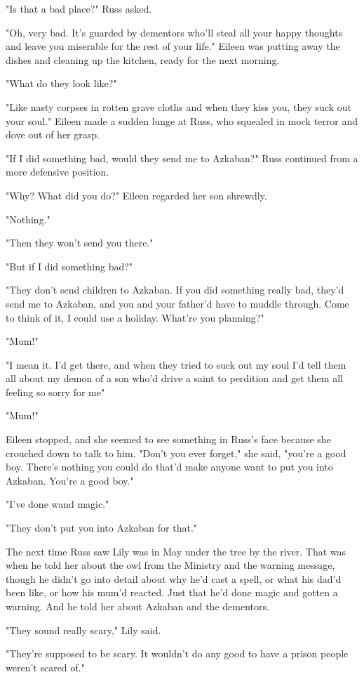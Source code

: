 "Is that a bad place?" Russ asked.

"Oh, very bad. It's guarded by dementors who'll steal all your happy thoughts and leave you miserable for the rest of your life." Eileen was putting away the dishes and cleaning up the kitchen, ready for the next morning.

"What do they look like?"

"Like nasty corpses in rotten grave cloths and when they kiss you, they suck out your soul." Eileen made a sudden lunge at Russ, who squealed in mock terror and dove out of her grasp.

"If I did something bad, would they send me to Azkaban?" Russ continued from a more defensive position.

"Why? What did you do?" Eileen regarded her son shrewdly.

"Nothing."

"Then they won't send you there."

"But if I did something bad?"

"They don't send children to Azkaban. If you did something really bad, they'd send me to Azkaban, and you and your father'd have to muddle through. Come to think of it, I could use a holiday. What're you planning?"

"Mum!"

"I mean it. I'd get there, and when they tried to suck out my soul I'd tell them all about my demon of a son who'd drive a saint to perdition and get them all feeling so sorry for me{\el}"

"Mum!"

Eileen stopped, and she seemed to see something in Russ's face because she crouched down to talk to him. "Don't you ever forget," she said, "you're a good boy. There's nothing you could do that'd make anyone want to put you into Azkaban. You're a good boy."

"I've done wand magic."

"They don't put you into Azkaban for that."

The next time Russ saw Lily was in May under the tree by the river. That was when he told her about the owl from the Ministry and the warning message, though he didn't go into detail about why he'd cast a spell, or what his dad'd been like, or how his mum'd reacted. Just that he'd done magic and gotten a warning. And he told her about Azkaban and the dementors.

"They sound really scary," Lily said.

"They're supposed to be scary. It wouldn't do any good to have a prison people weren't scared of."

